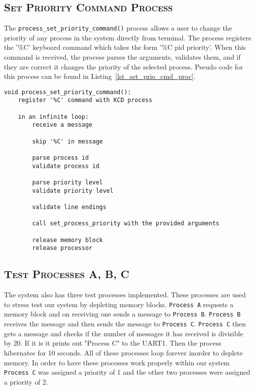 \documentclass[oneside]{report}
\begin{document}
\subsection{\textsc{Set Priority Command Process}}

The \texttt{process\_set\_priority\_command()} process allows a user
to change the priority of any process in the system directly from
terminal. The process registers the '\%C' keyboard command which takes
the form '\%C pid priority'. When this command is received, the
process parses the arguments, validates them, and if they are correct
it changes the priority of the selected process. Pseudo code for this
process can be found in Listing~\ref{lst_set_prio_cmd_proc}.


\begin{lstlisting}
void process_set_priority_command():    
    register '%C' command with KCD process
    
    in an infinite loop:
        receive a message

        skip '%C' in message

        parse process id
        validate process id

        parse priority level
        validate priority level

        validate line endings
        
        call set_process_priority with the provided arguments

        release memory block
        release processor

\end{lstlisting}

\subsection{\textsc{Test Processes A, B, C}}
The system also has three test processes implemented. These processes are used
to stress test our system by depleting memory blocks. \texttt{Process A}
requests a memory block and on receiving one sends a message to \texttt{Process
B}. \texttt{Process B} receives the message and then sends the message to
\texttt{Process C}. \texttt{Process C} then gets a message and checks if the
number of messages it has received is divisible by 20. If it is it prints out
"Process C" to the UART1. Then the process hibernates for 10 seconds. All of
these processes loop forever inorder to deplete memory. In order to have these
processes work properly within our system \texttt{Process C} was assigned a
priority of 1 and the other two processes were assigned a priority of 2.
\end{document}
